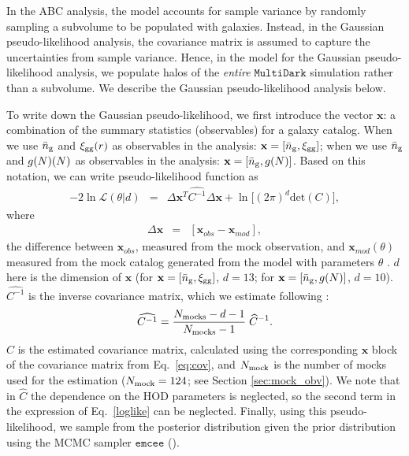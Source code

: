In the ABC analysis, the model accounts for sample variance by randomly sampling a subvolume to be 
populated with galaxies. Instead, in the Gaussian pseudo-likelihood analysis, the covariance matrix is assumed to capture the
uncertainties from sample variance. Hence, in the model for the Gaussian pseudo-likelihood analysis, 
we populate halos of the {\em entire} $\mathtt{MultiDark}$ simulation rather than a subvolume.
We describe the Gaussian pseudo-likelihood analysis below.


To write down the Gaussian pseudo-likelihood, we first introduce the vector $\mathbf{x}$: 
a combination of the summary statistics (observables) for a galaxy catalog. 
When we use $\bar{n}_{\mathrm{g}}$ and $\xi_{\mathrm{gg}}(r)$ as observables in the analysis: $\mathbf{x} = [\bar{n}_{\mathrm{g}} , \xi_{\mathrm{gg}}]$;
when we use $\bar{n}_{\mathrm{g}}$ and $g(N)(N)$ as observables in the analysis: $\mathbf{x} = [\bar{n}_{\mathrm{g}} , g(N)]$.
Based on this notation, we can write pseudo-likelihood function as 
\begin{eqnarray}
-2 \ln \mathcal{L}(\theta | d) &=& \Delta \mathbf{x}^{T}\widehat{C^{-1}}\Delta \mathbf{x} + \ln\Big[(2\pi)^{d}\mathrm{det}(C)\Big], \label{loglike}
\end{eqnarray}
where 
\begin{eqnarray}
\Delta \mathbf{x} &=& [\mathbf{x}_{obs} -\mathbf{x}_{mod}], 
\end{eqnarray}
the difference between $\mathbf{x}_{obs}$, measured from the mock observation, 
and $\mathbf{x}_{mod}(\mathbb{\theta})$ measured from the mock catalog generated 
from the model with parameters $\theta$ .
$d$ here is the dimension of $\mathbf{x}$ (for $\mathbf{x} = [\bar{n}_{\mathrm{g}}, \xi_{\mathrm{gg}}]$, $d = 13$; 
for $\mathbf{x} = [\bar{n}_{\mathrm{g}}, g(N)]$, $d = 10$).  
$\widehat{C^{-1}}$ is the inverse covariance matrix, which we estimate following \cite{hartlap2007}:
\begin{eqnarray}
\widehat{C^{-1}} = \frac{N_{\rm mocks}-d - 1}{N_{\rm mocks} -1} \; \widehat{C}^{-1}.
\end{eqnarray}
$\widehat{C}$ is the estimated covariance matrix, calculated using the corresponding 
$\mathbf{x}$ block of the covariance matrix from Eq.~\ref{eq:cov}, and $N_{\rm mock}$ 
is the number of mocks used for the estimation ($N_{\rm mock} = 124$; see Section \ref{sec:mock_obv}).
We note that in $\widehat{C}$ the dependence on the HOD parameters is neglected, 
so the second term in the expression of Eq.~\ref{loglike} can be neglected. 
Finally, using this pseudo-likelihood, we sample from the posterior distribution 
given the prior distribution using the MCMC sampler $\mathtt{emcee}$ (\citealt{emcee}). 

